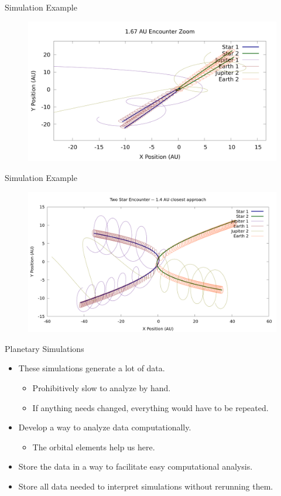 \documentclass{beamer}
\begin{document}
\begin{frame}{Simulation Example}
    \begin{figure}
        \centering
        \includegraphics[width=4.50in]{1_67_AU_zoom}
    \end{figure}
\end{frame}

\begin{frame}{Simulation Example}
    \begin{figure}
        \centering
        \includegraphics[height=2.5in]{1.4AU/1_4_AU_encounter_plot}
    \end{figure}
\end{frame}

\begin{frame}{Planetary Simulations}
    \begin{itemize}
        \item These simulations generate a lot of data.
            \begin{itemize}
                \item Prohibitively slow to analyze by hand.
                \item If anything needs changed, everything would have to be
                    repeated.
            \end{itemize}
        \item Develop a way to analyze data computationally.
            \begin{itemize}
                \item The orbital elements help us here.
            \end{itemize}
        \item Store the data in a way to facilitate easy computational
            analysis.
        \item Store all data needed to interpret simulations without rerunning them.
    \end{itemize}
\end{frame}
\end{document}
